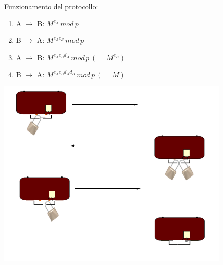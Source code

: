 \documentclass[a4paper, 11pt, notitlepage, fleqn]{report}
\begin{document}
\begin{minipage}{.6\textwidth}
\noindent Funzionamento del protocollo:
\begin{enumerate}
	\item A $\rightarrow$ B: $M^{e_A}\,mod\,p$
	\item B $\rightarrow$ A: $M^{e_Ae_B}\,mod\,p$
	\item A $\rightarrow$ B: $M^{e_Ae_Bd_A}\,mod\,p\ (=M^{e_B})$
	\item B $\rightarrow$ A: $M^{e_Ae_Bd_Ad_B}\,mod\,p\ (= M)$
\end{enumerate}
\end{minipage}
\begin{minipage}{.4\textwidth}
	\centering
	\includegraphics[width=.9\textwidth]{images/MasseyOmura}
\end{minipage}
\end{document}
